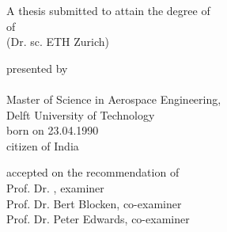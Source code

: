 
\begin{titlepage}

\begin{center}
	\large
	\begingroup
	\endgroup
	
	\hfill
	
	\vfill
	
	\begingroup
	\textbf{\spacedallcaps{\myTitle}}
	\endgroup
	
	\vfill
	
	\vfill
	
	\begingroup
	A thesis submitted to attain the degree of\\
	\vspace{2mm}
	 of \\
	(Dr. sc. ETH Zurich)
	\endgroup
	
	\vfill
	
	\begingroup
	presented by\\
	\vspace{2mm}
	\spacedlowsmallcaps{\myName}\\
	\vspace{8mm}
	Master of Science in Aerospace Engineering, \\
	Delft University of Technology \\
	\vspace{8mm}
	born on 23.04.1990\\
	\vspace{2mm}
	citizen of India
	\endgroup
	
	\vfill
	
	\begingroup
	accepted on the recommendation of\\
	\vspace{2mm}
	Prof. Dr. \myProf, examiner\\            
	Prof. Dr. Bert Blocken, co-examiner\\            	
	Prof. Dr. Peter Edwards, co-examiner
	\endgroup
	
	\vfill
	
	\myTime
	
	\vfill               
	
\end{center}  

\end{titlepage}